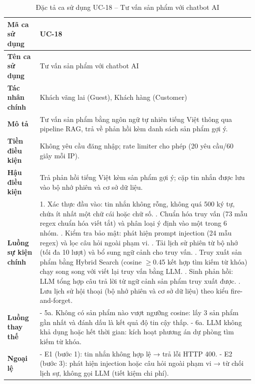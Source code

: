 \begin{longtable}{|p{3cm}|p{10.5cm}|}
  \caption{Đặc tả ca sử dụng UC-18 -- Tư vấn sản phẩm với chatbot AI}
  \label{tab:uc_spec_18} \\
  \hline
  \textbf{Mã ca sử dụng} & UC-18 \\ \hline
  \textbf{Tên ca sử dụng} & Tư vấn sản phẩm với chatbot AI \\ \hline
  \textbf{Tác nhân chính} & Khách vãng lai (Guest), Khách hàng (Customer) \\ \hline
  \textbf{Mô tả} & Tư vấn sản phẩm bằng ngôn ngữ tự nhiên tiếng Việt thông qua pipeline RAG, trả về phản hồi kèm danh sách sản phẩm gợi ý. \\ \hline
  \textbf{Tiền điều kiện} & Không yêu cầu đăng nhập; rate limiter cho phép (20 yêu cầu\slash 60 giây mỗi IP). \\ \hline
  \textbf{Hậu điều kiện} & Trả phản hồi tiếng Việt kèm sản phẩm gợi ý; cặp tin nhắn được lưu vào bộ nhớ phiên và cơ sở dữ liệu. \\ \hline
  \textbf{Luồng sự kiện chính} &
  1. Xác thực đầu vào: tin nhắn không rỗng, không quá 500 ký tự, chứa ít nhất một chữ cái hoặc chữ số. \newline
  2. Chuẩn hóa truy vấn (73 mẫu regex chuẩn hóa viết tắt) và phân loại ý định vào một trong 6 nhóm. \newline
  3. Kiểm tra bảo mật: phát hiện prompt injection (24 mẫu regex) và lọc câu hỏi ngoài phạm vi. \newline
  4. Tải lịch sử phiên từ bộ nhớ (tối đa 10 lượt) và bổ sung ngữ cảnh cho truy vấn. \newline
  5. Truy xuất sản phẩm bằng Hybrid Search (cosine $\geq$0.45 kết hợp tìm kiếm từ khóa) chạy song song với viết lại truy vấn bằng LLM. \newline
  6. Sinh phản hồi: LLM tổng hợp câu trả lời từ ngữ cảnh sản phẩm truy xuất được. \newline
  7. Lưu lịch sử hội thoại (bộ nhớ phiên và cơ sở dữ liệu) theo kiểu fire-and-forget. \\ \hline
  \textbf{Luồng thay thế} &
  - 5a. Không có sản phẩm nào vượt ngưỡng cosine: lấy 3 sản phẩm gần nhất và đánh dấu là kết quả độ tin cậy thấp. \newline
  - 6a. LLM không khả dụng hoặc hết thời gian: kích hoạt phương án dự phòng tìm kiếm từ khóa. \\ \hline
  \textbf{Ngoại lệ} &
  - E1 (bước 1): tin nhắn không hợp lệ → trả lỗi HTTP 400. \newline
  - E2 (bước 3): phát hiện injection hoặc câu hỏi ngoài phạm vi → từ chối lịch sự, không gọi LLM (tiết kiệm chi phí). \\ \hline
\end{longtable}

